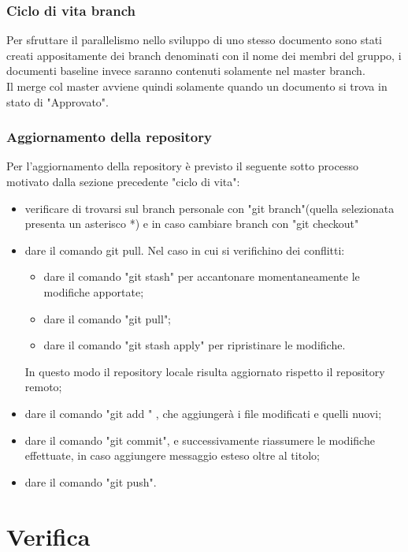 \documentclass[NormeDiProgetto.tex]{subfiles}
\begin{document}
	\subsubsection{Ciclo di vita branch}
	Per sfruttare il parallelismo nello sviluppo di uno stesso documento sono stati creati appositamente dei branch denominati con il nome dei membri del gruppo, i documenti baseline invece saranno contenuti solamente nel master branch.\\
	Il merge col master avviene quindi solamente quando un documento si trova in stato di "Approvato".
	
	\subsubsection{Aggiornamento della repository}
	Per l’aggiornamento della repository è previsto il seguente sotto processo motivato dalla sezione precedente "ciclo di vita":
	\begin{itemize}
		\item verificare di trovarsi sul branch personale con "git branch"(quella selezionata presenta un asterisco *) e in caso cambiare branch con "git checkout"
		\item dare il comando git pull. Nel caso in cui si verifichino dei conflitti:
		\begin{itemize}
			\item dare il comando "git stash" per accantonare momentaneamente	le modifiche apportate;
			\item dare il comando "git pull";
			\item dare il comando "git stash apply" per ripristinare le modifiche.
		\end{itemize}	In questo modo il repository locale risulta aggiornato rispetto il repository remoto;
	
		\item dare il comando "git add \textasteriskcentered" , che aggiungerà i file modificati e quelli nuovi;
		\item dare il comando "git commit", e successivamente riassumere le modifiche effettuate, in caso aggiungere messaggio esteso oltre al titolo;
		\item dare il comando "git push".
	\end{itemize}
	
	\section{Verifica}
	
\end{document}
